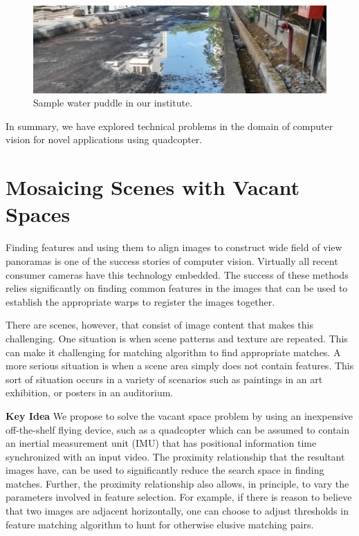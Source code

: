\documentclass[11pt]{article}
\begin{document}
\begin{figure}[ht!]
 \centering
  \includegraphics[width=\linewidth]{IMG_20150302_160349385_HDR.jpg}
  \caption{Sample water puddle in our institute.}
  \label{fig:puddle}
\end{figure}
 
In summary, we have explored technical problems in the domain of computer
vision for novel applications using quadcopter.

\section{Mosaicing Scenes with Vacant Spaces}

Finding features and using them to align images to construct wide field
of view panoramas is one of the success stories of
computer vision.  Virtually all recent consumer cameras have this
technology embedded.  The success of these methods relies significantly on
finding common features in the images that can be used to establish the
 appropriate warps to register the images together.

There are scenes, however, that consist of image content that makes this
challenging.  One situation is when scene patterns and texture are repeated.  
This can make it challenging for matching algorithm to find appropriate matches.
A more serious situation is when a scene area simply
does not contain features.  This sort of situation occurs in a variety
of scenarios such as paintings in an art exhibition, or posters in an
auditorium.

{\bf Key Idea} We propose to solve the vacant space problem by using
an inexpensive off-the-shelf flying device, such as a quadcopter which
can be assumed to contain an inertial measurement unit (IMU) that has
positional information time synchronized with an input video.  The
proximity relationship that the resultant images have, can be used to
significantly reduce the search space in finding matches.  Further,
the proximity relationship also allows, in principle, to vary the
parameters involved in feature selection. For example, if there is
reason to believe that two images are adjacent horizontally, one can
choose to adjust thresholds in feature matching algorithm to hunt for
otherwise elusive matching pairs.
\end{document}
